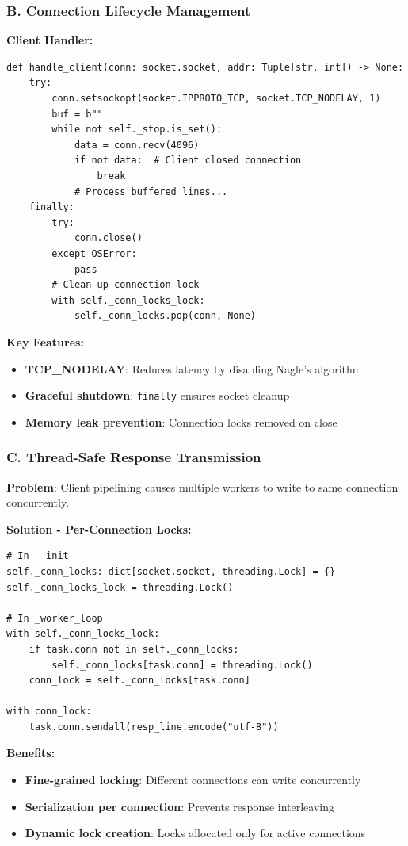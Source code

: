 \documentclass[12pt]{article}
\begin{document}
\subsubsection{B. Connection Lifecycle Management}

\textbf{Client Handler:}
\begin{lstlisting}
def handle_client(conn: socket.socket, addr: Tuple[str, int]) -> None:
    try:
        conn.setsockopt(socket.IPPROTO_TCP, socket.TCP_NODELAY, 1)
        buf = b""
        while not self._stop.is_set():
            data = conn.recv(4096)
            if not data:  # Client closed connection
                break
            # Process buffered lines...
    finally:
        try:
            conn.close()
        except OSError:
            pass
        # Clean up connection lock
        with self._conn_locks_lock:
            self._conn_locks.pop(conn, None)
\end{lstlisting}

\textbf{Key Features:}
\begin{itemize}
    \item \textbf{TCP\_NODELAY}: Reduces latency by disabling Nagle's algorithm
    \item \textbf{Graceful shutdown}: \texttt{finally} ensures socket cleanup
    \item \textbf{Memory leak prevention}: Connection locks removed on close
\end{itemize}

\subsubsection{C. Thread-Safe Response Transmission}

\textbf{Problem}: Client pipelining causes multiple workers to write to same connection concurrently.

\textbf{Solution - Per-Connection Locks:}
\begin{lstlisting}
# In __init__
self._conn_locks: dict[socket.socket, threading.Lock] = {}
self._conn_locks_lock = threading.Lock()

# In _worker_loop
with self._conn_locks_lock:
    if task.conn not in self._conn_locks:
        self._conn_locks[task.conn] = threading.Lock()
    conn_lock = self._conn_locks[task.conn]

with conn_lock:
    task.conn.sendall(resp_line.encode("utf-8"))
\end{lstlisting}

\textbf{Benefits:}
\begin{itemize}
    \item \textbf{Fine-grained locking}: Different connections can write concurrently
    \item \textbf{Serialization per connection}: Prevents response interleaving
    \item \textbf{Dynamic lock creation}: Locks allocated only for active connections
\end{itemize}
\end{document}
